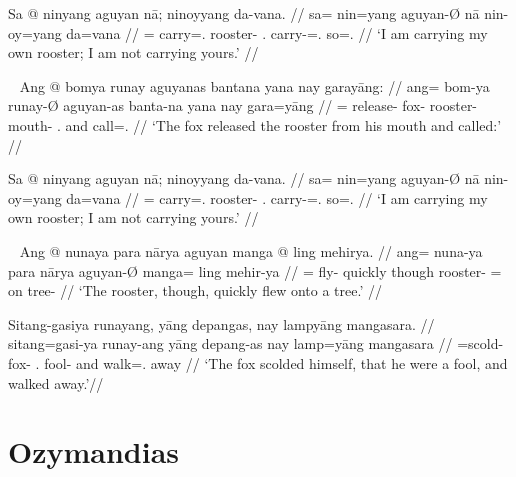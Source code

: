 \a\label{ex:negativbindung}\begingl
	\gla Sa @ ninyang aguyan nā; ninoyyang da-vana. //
	\glb sa= nin=yang aguyan-Ø nā nin-oy=yang da=vana //
	\glc \PatT{}= carry=\Fsg{}.\Aarg{} rooster-\Top{} \Fsg{}.\Gen{}
		carry-\Neg{}=\Fsg{}.\Aarg{} so=\Spl{}.\Gen{} //
	\glft `I am carrying my own rooster; I am not carrying yours.' //
\endgl

\xe

\pex~ %
\a\begingl
	\gla Ang @ bomya runay aguyanas bantana yana nay garayāng: //
	\glb ang= bom-ya runay-Ø aguyan-as banta-na yana nay gara=yāng //
	\glc \AgtT{}= release-\TsgM{} fox-\Top{} rooster-\Parg{} mouth-\Gen{}
		\TsgM{}.\Gen{} and call=\TsgM{}.\Aarg{} //
	\glft `The fox released the rooster from his mouth and called:' //
\endgl

\a\begingl
	\gla Sa @ ninyang aguyan nā; ninoyyang da-vana. //
	\glb sa= nin=yang aguyan-Ø nā nin-oy=yang da=vana //
	\glc \PatT{}= carry=\Fsg{}.\Aarg{} rooster-\Top{} \Fsg{}.\Gen{}
		carry-\Neg{}=\Fsg{}.\Aarg{} so=\Spl{}.\Gen{} //
	\glft `I am carrying my own rooster; I am not carrying yours.' //
\endgl

\xe

\pex~ %
\a\begingl
	\gla Ang @ nunaya para nārya aguyan manga @ ling mehirya. //
	\glb ang= nuna-ya para nārya aguyan-Ø manga= ling mehir-ya //
	\glc \AgtT{}= fly-\TsgM{} quickly though rooster-\Top{} \Dir{}= on
		tree-\Loc{} //
	\glft `The rooster, though, quickly flew onto a tree.' //
\endgl

\a\label{ex:objpred}\begingl
	\gla Sitang-gasiya runayang, yāng depangas, nay lampyāng mangasara. //
	\glb sitang=gasi-ya runay-ang yāng depang-as nay lamp=yāng mangasara //
	\glc \Refl{}=scold-\TsgM{} fox-\Aarg{} \TsgM{}.\Aarg{} fool-\Parg{} and
		walk=\TsgM{}.\Aarg{} away //
	\glft `The fox scolded himself, that he were a fool, and walked 
		away.'\footnotemark //
\endgl

\xe


\section{Ozymandias}
\label{sec:ozymandias}


\citep[Adapted and corrected from][]{becker:ozymandias}\medskip

